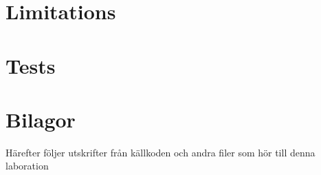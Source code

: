 \documentclass[titlepage, twocolumn, a4paper, 10pt]{article}
\begin{document}



\section{Limitations}\label{sec:limitations}


\section{Tests}\label{sec:tests}






\newpage
\appendix
{}
\section{Bilagor}\label{sec:kallkod}
Härefter följer utskrifter från källkoden och andra filer som hör till
denna laboration
\end{document}
